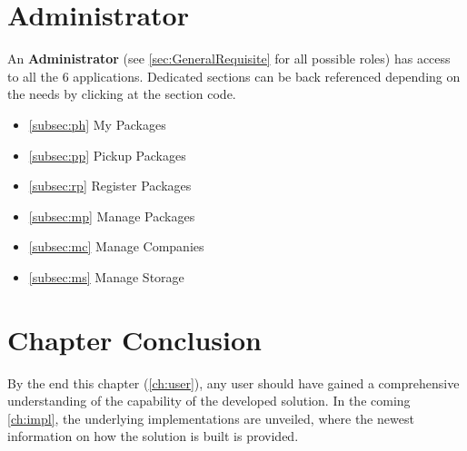 \section{Administrator}
\label{sec:UdocAdministrator}

An \textbf{Administrator} (see \autoref{sec:GeneralRequisite} for all possible roles) has access to all the 6 applications.
Dedicated sections can be back referenced depending on the needs by clicking at the section code.

\begin{itemize}
    \item \ref{subsec:ph} My Packages
    \item \ref{subsec:pp} Pickup Packages
    \item \ref{subsec:rp} Register Packages
    \item \ref{subsec:mp} Manage Packages
    \item \ref{subsec:mc} Manage Companies
    \item \ref{subsec:ms} Manage Storage
\end{itemize}

\section*{Chapter Conclusion}

By the end this chapter (\autoref{ch:user}), any user should have gained a comprehensive understanding of the capability of the developed solution. In the coming \autoref{ch:impl}, the underlying implementations are unveiled, where the newest information on how the solution is built is provided.